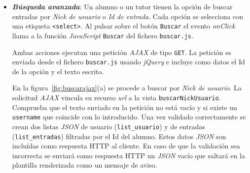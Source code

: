 \documentclass[a4paper, 12pt]{book}
\begin{document}
\begin{itemize}
  La funci\'on \textit{AJAX} no recibe ning\'un dato como respuesta.
  
  \begin{figure}
    \centering
    \caption{\textit{Eliminaci\'on de un alumno en el hilo de un tutor.}}
    \label{fig:eliminaralumno}
  \end{figure}
  
  
  \item {\bfseries \textit{B\'usqueda avanzada}}: Un alumno o un tutor tienen la opci\'on de buscar entradas por \textit{Nick de usuario} o 
  \textit{Id de entrada}. Cada opci\'on se selecciona con una etiqueta \texttt{<select>}. Al pulsar sobre el bot\'on \texttt{Buscar} el evento 
  \textit{onClick} llama a la funci\'on \textit{JavaScript} \texttt{Buscar} del fichero \texttt{buscar.js}. 
  
  Ambas acciones ejecutan una petici\'on \textit{AJAX} de tipo \texttt{GET}. La petici\'on es enviada desde el fichero \texttt{buscar.js} usando 
  \textit{jQuery} e incluye como datos el Id de la opci\'on y el texto escrito.

  En la figura~\ref{fig:buscarajax}(a) se procede a buscar por \textit{Nick de usuario}. La solicitud \textit{AJAX} vincula su recurso \textit{url} a la 
  vista \texttt{buscarNickUsuario}. Comprueba que el texto enviado en la petici\'on no est\'a vac\'io y si existe un \texttt{username} que coincide con lo
  introducido. Una vez validado correctamente se crean dos listas \textit{JSON} de usuario (\texttt{list\_usuario}) y de entradas (\texttt{list\_entradas}) 
  filtradas por el Id del alumno. Estos datos \textit{JSON} son inclu\'idas como respuesta HTTP al cliente. En caso de que la validaci\'on sea incorrecta 
  se enviar\'a como respuesta HTTP un \textit{JSON} vac\'io que saltar\'a en la plantilla renderizada como un mensaje de aviso.


\end{itemize}
\end{document}
